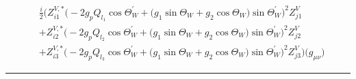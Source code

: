 \begin{align} 
 &\frac{i}{2} \Big(Z^{V,*}_{i 1} \Big(-2 g_p Q_{l_1} \cos\Theta_W^{\prime}   + \Big(g_1 \sin\Theta_W   + g_2 \cos\Theta_W  \Big)\sin\Theta_W^{\prime}  \Big)^{2} Z_{{j 1}}^{V} \nonumber \\ 
 &+Z^{V,*}_{i 2} \Big(-2 g_p Q_{l_2} \cos\Theta_W^{\prime}   + \Big(g_1 \sin\Theta_W   + g_2 \cos\Theta_W  \Big)\sin\Theta_W^{\prime}  \Big)^{2} Z_{{j 2}}^{V} \nonumber \\ 
 &+Z^{V,*}_{i 3} \Big(-2 g_p Q_{l_3} \cos\Theta_W^{\prime}   + \Big(g_1 \sin\Theta_W   + g_2 \cos\Theta_W  \Big)\sin\Theta_W^{\prime}  \Big)^{2} Z_{{j 3}}^{V} \Big)\Big(g_{\mu \nu}\Big)\end{align} 
\hrule 
